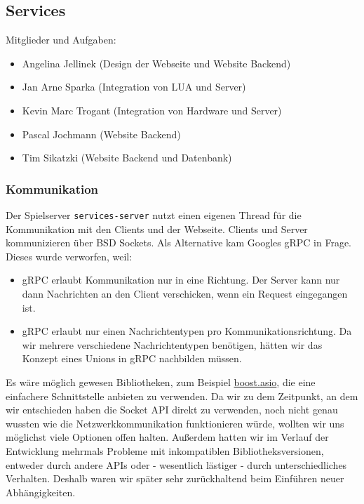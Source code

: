 \subsection{Services}
\label{services}

Mitglieder und Aufgaben:
\begin{itemize}
  \item
    Angelina Jellinek (Design der Webseite und Website Backend)
  \item
    Jan Arne Sparka (Integration von LUA und Server)
  \item
    Kevin Marc Trogant (Integration von Hardware und Server)
  \item
    Pascal Jochmann (Website Backend)
  \item
    Tim Sikatzki (Website Backend und Datenbank)
\end{itemize}

\subsubsection{Kommunikation}

Der Spielserver \texttt{services-server} nutzt einen eigenen Thread für die Kommunikation mit den Clients und
der Webseite. Clients und Server kommunizieren über BSD Sockets.
Als Alternative kam Googles gRPC in Frage. Dieses wurde verworfen, weil:
\begin{itemize}
    \item gRPC erlaubt Kommunikation nur in eine Richtung. Der Server kann nur dann Nachrichten an den Client verschicken,  wenn ein Request eingegangen ist.
    \item gRPC erlaubt nur einen Nachrichtentypen pro Kommunikationsrichtung. Da wir mehrere verschiedene Nachrichtentypen benötigen, hätten wir das Konzept eines Unions in gRPC nachbilden müssen.
\end{itemize}
Es wäre möglich gewesen Bibliotheken, zum Beispiel \href{http://think-async.com/Asio/WebHome}{boost.asio}, die eine einfachere Schnittstelle anbieten zu verwenden. Da wir zu dem Zeitpunkt, an dem wir entschieden haben die Socket API direkt zu verwenden, noch nicht genau wussten wie die Netzwerkkommunikation funktionieren würde, wollten wir uns möglichst viele Optionen offen halten. Außerdem hatten wir im Verlauf der Entwicklung mehrmals Probleme mit inkompatiblen Bibliotheksversionen, entweder durch andere APIs oder - wesentlich lästiger - durch unterschiedliches Verhalten. Deshalb waren wir später sehr zurückhaltend beim Einführen neuer Abhängigkeiten.

